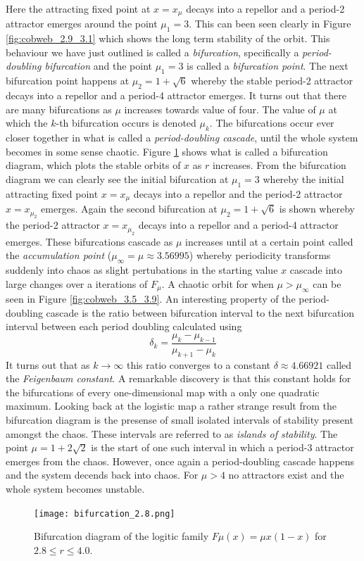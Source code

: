 \documentclass[11pt,a4paper,oneside]{memoir}
\theoremstyle{plain}
\theoremstyle{definition}
\begin{document}
Here the attracting fixed point at $x = x_\mu$ decays into a repellor and a period-2 attractor emerges around the point $\mu_1 = 3$. This can been seen clearly in Figure \ref{fig:cobweb_2.9_3.1} which shows the long term stability of the orbit. This behaviour we have just outlined is called a \emph{bifurcation}, specifically a \emph{period-doubling bifurcation} and the point $\mu_1 = 3$ is called a \emph{bifurcation point}. The next bifurcation point happens at $\mu_2 = 1 + \sqrt{6}$ whereby the stable period-2 attractor decays into a repellor and a period-4 attractor emerges. It turns out that there are many bifurcations as $\mu$ increases towards value of four. The value of $\mu$ at which the $k$-th bifurcation occurs is denoted $\mu_k$. The bifurcations occur ever closer together in what is called a \emph{period-doubling cascade}, until the whole system becomes in some sense chaotic. Figure \ref{fig:bifurcation_2.8} shows what is called a bifurcation diagram, which plots the stable orbits of $x$ as $r$ increases. From the bifurcation diagram we can clearly see the initial bifurcation at $\mu_1 = 3$ whereby the initial attracting fixed point $x = x_\mu$ decays into a repellor and the period-2 attractor $x = x_{\mu_2}$ emerges. Again the second bifurcation at $\mu_2 = 1 + \sqrt{6}$ is shown whereby the period-2 attractor $x = x_{\mu_2}$ decays into a repellor and a period-4 attractor emerges. These bifurcations cascade as $\mu$ increases until at a certain point called the \emph{accumulation point} ($\mu_\infty = \mu \approx 3.56995$) whereby periodicity transforms suddenly into chaos as slight pertubations in the starting value $x$ cascade into large changes over a iterations of $F_\mu$. A chaotic orbit for when $\mu > \mu_\infty$ can be seen in Figure \ref{fig:cobweb_3.5_3.9}. An interesting property of the period-doubling cascade is the ratio between bifurcation interval to the next bifurcation interval between each period doubling calculated using \[\delta_k  = \frac{\mu_k - \mu_{k-1}}{\mu_{k+1}-\mu_k}\]It turns out that as $k \to \infty$ this ratio converges to a constant $\delta \approx 4.66921$ called the \emph{Feigenbaum constant}. A remarkable discovery is that this constant holds for the bifurcations of every one-dimensional map with a only one quadratic maximum. Looking back at the logistic map a rather strange result from the bifurcation diagram is the presense of small isolated intervals of stability present amongst the chaos. These intervals are referred to as \emph{islands of stability}. The point $\mu = 1 + 2\sqrt{2}$ is the start of one such interval in which a period-3 attractor emerges from the chaos. However, once again a period-doubling cascade happens and the system decends back into chaos. For $\mu > 4$ no attractors exist and the whole system becomes unstable.
\begin{figure}[h]
    \centering
    \texttt{[image: bifurcation\_2.8.png]}
    \caption{Bifurcation diagram of the logitic family $F\mu(x) = \mu x(1-x)$ for $2.8 \leq r \leq 4.0$.}
    \label{fig:bifurcation_2.8}
\end{figure}
\end{document}
